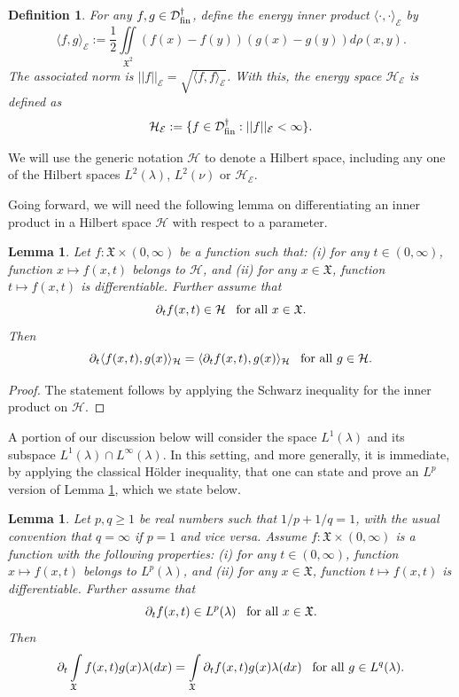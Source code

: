 \documentclass[11pt,reqno]{amsart}
\newtheorem{lemma}[theorem]{Lemma}
\newtheorem{definition}[theorem]{Definition}
\theoremstyle{remark}
\theoremstyle{definition}
\numberwithin{theorem}{section} \numberwithin{equation}{section}
\newcommand{\D}{\mathcal{D}}
\newcommand{\HE}{\mathcal{H}_\mathcal{E}}
\newcommand{\Hil}{\mathcal{H}}
\newcommand{\X}{\mathfrak{X}}
\newcommand{\E}{\mathcal{E}}
\begin{document}
\begin{definition} For any $f, g \in \D_{\rm fin}^{\dagger}$, define the energy inner product $  \langle\cdot, \cdot \rangle_{\E}$ by
 $$
  \langle f,g\rangle_{\E}:=\frac{1}{2}\iint\limits_{\X^2}(f(x)-f(y))(g(x)-g(y))d\rho(x,y).
  $$
The associated norm is $||f||_{\E} =\sqrt{\langle f,f\rangle_{\E}}$.  With this,
the energy space $\HE$ is defined as
  $$
  \HE:=\{f\in \D_{\rm fin}^{\dagger}: ||f||_{\E}<\infty\}.
  $$
\end{definition}

\medskip
\noindent
We will use the generic notation $\Hil$ to denote a Hilbert space, including any one of
the Hilbert spaces $L^{2}(\lambda)$, $L^{2}(\nu)$ or $\HE$.

\medskip
Going forward, we will need the following lemma on differentiating an inner product in a Hilbert space $\Hil$ with respect to a parameter.

\begin{lemma} \label{lem: dif of inner product wrt t}
   Let $f:\X\times(0,\infty)$ be a function such that: (i) for any $t\in(0,\infty)$, function $x\mapsto f(x,t)$ belongs to $\Hil$, and (ii) for any $x\in\X$, function $t\mapsto f(x,t)$ is differentiable. Further assume that
   $$
   \partial_t f(x,t)\in \Hil
   \,\,\,\,\,
   \text{\rm for all $x\in\X$.}
   $$
    Then
   $$\partial_t \langle f(x,t),g(x)\rangle_{\Hil} = \langle \partial _t f(x,t),g(x)\rangle_{\Hil}
   \,\,\,\,\,
   \text{\rm for all $g\in\Hil.$}
   $$
\end{lemma}
\begin{proof}
The statement follows by applying the Schwarz inequality for the inner product on $\Hil$.
\end{proof}

A portion of our discussion below will consider the space $L^{1}(\lambda)$ and
its subspace $L^{1}(\lambda) \cap L^{\infty}(\lambda)$.  In this setting, and more generally,
it is immediate, by applying the classical H\"older inequality, that one can state and prove an $L^{p}$ version of Lemma \ref{lem: dif of inner product wrt t}, which we state below.

\begin{lemma}\label{rem:Lp_differentiation}
Let $p, q \geq 1$ be real numbers such that $1/p+1/q = 1$, with the usual convention that
$q=\infty$ if $p=1$ and vice versa. Assume $f:\X\times(0,\infty)$ is a function with the following properties: (i) for any $t\in(0,\infty)$, function $x\mapsto f(x,t)$ belongs to $L^{p}(\lambda)$, and (ii) for any $x\in\X$, function $t\mapsto f(x,t)$ is differentiable. Further assume that
   $$
   \partial_t f(x,t)\in L^{p}(\lambda)
   \,\,\,\,\,
   \text{\rm for all $x\in\X$.}
   $$
    Then
   $$\partial_t \int\limits_\X f(x,t)g(x) \lambda(dx) = \int\limits_\X \partial _t f(x,t)g(x)\lambda(dx)
   \,\,\,\,\,
   \text{\rm for all $g\in L^{q}(\lambda).$}
   $$
\end{lemma}
\end{document}
